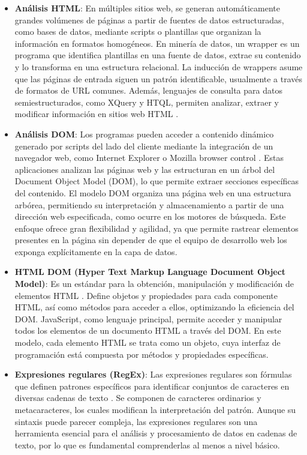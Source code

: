 \begin{itemize}
    \item \textbf{Análisis HTML}: En múltiples sitios web, se generan automáticamente grandes volúmenes de páginas a partir de fuentes de datos estructuradas, como bases de datos, mediante scripts o plantillas que organizan la información en formatos homogéneos. 
    En minería de datos, un wrapper es un programa que identifica plantillas en una fuente de datos, extrae su contenido y lo transforma en una estructura relacional. 
    La inducción de wrappers asume que las páginas de entrada siguen un patrón identificable, usualmente a través de formatos de URL comunes. 
    Además, lenguajes de consulta para datos semiestructurados, como XQuery y HTQL, permiten analizar, extraer y modificar información en sitios web HTML \cite{miningweb}.

    \item \textbf{Análisis DOM}: Los programas pueden acceder a contenido dinámico generado por scripts del lado del cliente mediante la integración de un navegador web, como Internet Explorer o Mozilla browser control \cite{domparsing}. 
    Estas aplicaciones analizan las páginas web y las estructuran en un árbol del Document Object Model (DOM), lo que permite extraer secciones específicas del contenido.
    El modelo DOM organiza una página web en una estructura arbórea, permitiendo su interpretación y almacenamiento a partir de una dirección web especificada, como ocurre en los motores de búsqueda. 
    Este enfoque ofrece gran flexibilidad y agilidad, ya que permite rastrear elementos presentes en la página sin depender de que el equipo de desarrollo web los exponga explícitamente en la capa de datos.

    \item \textbf{HTML DOM (Hyper Text Markup Language Document Object Model)}: Es un estándar para la obtención, manipulación y modificación de elementos HTML \cite{Gunawan}. 
    Define objetos y propiedades para cada componente HTML, así como métodos para acceder a ellos, optimizando la eficiencia del DOM.
    JavaScript, como lenguaje principal, permite acceder y manipular todos los elementos de un documento HTML a través del DOM. 
    En este modelo, cada elemento HTML se trata como un objeto, cuya interfaz de programación está compuesta por métodos y propiedades específicas.

    \item \textbf{Expresiones regulares (RegEx)}: Las expresiones regulares son fórmulas que definen patrones específicos para identificar conjuntos de caracteres en diversas cadenas de texto \cite{oreilywebacraping}. 
    Se componen de caracteres ordinarios y metacaracteres, los cuales modifican la interpretación del patrón.
    Aunque su sintaxis puede parecer compleja, las expresiones regulares son una herramienta esencial para el análisis y procesamiento de datos en cadenas de texto, por lo que es fundamental comprenderlas al menos a nivel básico.
    

\end{itemize}
